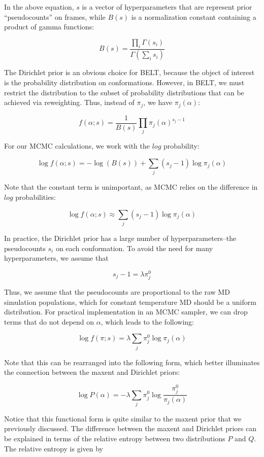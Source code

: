 \documentclass[12pt]{article}
\begin{document}
In the above equation, $s$ is a vector of hyperparameters that are represent prior ``pseudocounts'' on frames, while $B(s)$ is a normalization constant containing a product of gamma functions:

$$B(s) = \frac{\prod_i \Gamma(s_i)}{\Gamma(\sum_i s_i)}$$

The Dirichlet prior is an obvious choice for BELT, because the object of interest is the probability distribution on conformations.  However, in BELT, we must restrict the distribution to the subset of probability distributions that can be achieved via reweighting.  Thus, instead of $\pi_j$, we have $\pi_j(\alpha)$:

$$f(\alpha;s) = \frac{1}{B(s)} \prod_j \pi_j(\alpha)^{s_j - 1}$$

For our MCMC calculations, we work with the $log$ probability:

$$\log f(\alpha;s) = -\log(B(s)) + \sum_j (s_j - 1) \log \pi_j(\alpha)$$

Note that the constant term is unimportant, as MCMC relies on the difference in $log$ probabilities:

$$\log f(\alpha;s) \approx \sum_j (s_j - 1) \log \pi_j(\alpha)$$

In practice, the Dirichlet prior has a large number of hyperparameters--the pseudocounts $s_i$ on each conformation.  To avoid the need for many hyperparameters, we assume that 

$$s_j - 1 = \lambda \pi_j^0$$

Thus, we assume that the pseudocounts are proportional to the raw MD simulation populations, which for constant temperature MD should be a uniform distribution.  For practical implementation in an MCMC sampler, we can drop terms that do not depend on $\alpha$, which leads to the following:

$$\log f(\pi;s) =  \lambda \sum_j \pi_j^0 \log \pi_j(\alpha)$$

Note that this can be rearranged into the following form, which better illuminates the connection between the maxent and Dirichlet priors:

$$\log P(\alpha) = -\lambda \sum_j \pi_j^0 \log \frac{\pi_j^0}{\pi_j(\alpha)}$$

Notice that this functional form is quite similar to the maxent prior that we previously discussed.  The difference between the maxent and Dirichlet priors can be explained in terms of the relative entropy between two distributions $P$ and $Q$.  The relative entropy is given by
\end{document}
